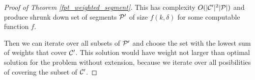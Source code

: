 \begin{proof}[Proof of Theorem \ref{fpt_weighted_segment}]
This has complexity $O(|\mathcal{C}'|^2|\mathcal{P}|)$ and produce shrunk down
set of segments $\mathcal{P}'$ of size $f(k, \delta)$
for some computable function $f$.

Then we can iterate over all subsets of $\mathcal{P}'$ and
choose the set with the lowest sum of weights that cover $\mathcal{C}'$.
This solution
would have weight not larger than optimal solution
for the problem without extension, because we iterate
over all posibilities of covering the subset of $\mathcal{C}'$.
\end{proof}

